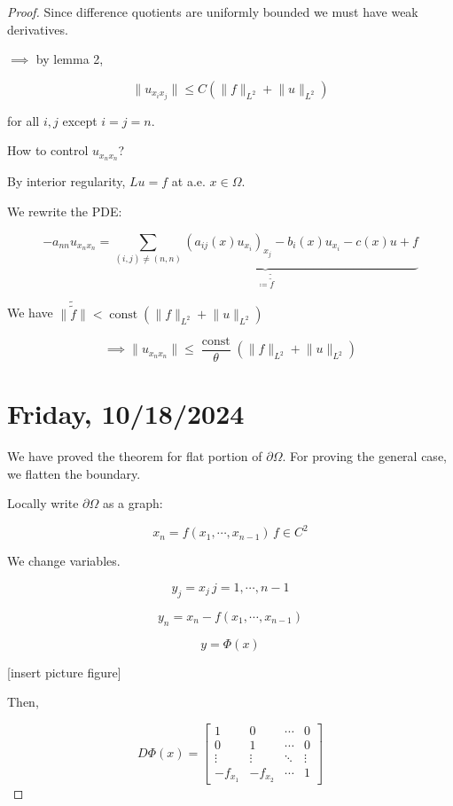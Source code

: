 \documentclass{article}
\theoremstyle{definition}
\begin{document}
\begin{proof}
    Since difference quotients are uniformly bounded we must have weak derivatives.

    \(\implies\) by lemma 2,

    \[
        \lVert u_{x_i x_j} \rVert \leq C \left( \lVert f \rVert _{L^2} + \lVert u \rVert _{L^2} \right)
    \]

    for all \(i,j\) except \(i=j=n\).

    How to control \(u_{x_n x_n}\)?

    By interior regularity, \(L u = f\) at a.e. \(x\in \Omega\).

    We rewrite the PDE:

    \[
        - a_{n n} u_{x_n x_n} = \underbrace{\sum_{(i,j) \neq (n,n)} (a_{ij} (x) u_{x_i})_{x_j}  - b_i(x) u_{x_i} - c(x)u + f}_{\coloneqq \tilde{\tilde{f}}}
    \]

    We have \(\lVert \tilde{\tilde{f}} \rVert < \operatorname{const}(\lVert f \rVert _{L^2} + \lVert u \rVert _{L^2})\) 

    \[
        \implies \lVert u_{x_n x_n}  \rVert \leq \frac{\operatorname{const}}{\theta} \left( \lVert f \rVert _{L^2} + \lVert u \rVert _{L^2} \right) 
    \]

    \section*{Friday, 10/18/2024}
    

    We have proved the theorem for flat portion of \(\partial \Omega\). For proving the general case, we flatten the boundary.

    Locally write \(\partial \Omega\) as a graph:

    \[
        x_n = f(x_1, \cdots , x_{n-1}) \, f \in C^2
    \]

    We change variables.

    \[
        y_j = x_j \, j = 1, \cdots , n-1
    \]

    \[
        y_n = x_n - f(x_1, \cdots , x_{n-1})
    \]

    \[
        y = \Phi(x)
    \]

    [insert picture figure]

    Then,

    \[
        D \Phi (x) = \begin{bmatrix}
            1 & 0 & \cdots &  0 \\
            0 & 1 & \cdots &  0 \\
            \vdots & \vdots & \ddots  &  \vdots \\
            - f_{x_1} & -f_{x_2} & \cdots & 1
        \end{bmatrix}
    \]


\end{proof}
\end{document}
